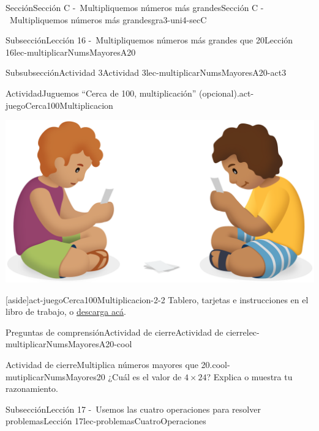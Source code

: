 \documentclass[twoside,10pt,]{article}
\begin{document}
\begin{sectionptx}{Sección}{Sección C -~Multipliquemos números más grandes}{}{Sección C -~Multipliquemos números más grandes}{}{}{gra3-uni4-secC}
\begin{subsectionptx}{Subsección}{Lección 16 -~Multipliquemos números más grandes que 20}{}{Lección 16}{}{}{lec-multiplicarNumsMayoresA20}
\begin{subsubsectionptx}{Subsubsección}{Actividad 3}{}{Actividad 3}{}{}{lec-multiplicarNumsMayoresA20-act3}
\begin{activity}{Actividad}{Juguemos “Cerca de 100, multiplicación” (opcional).}{act-juegoCerca100Multiplicacion}
\begin{sidebyside}{2}{0.05}{0.05}{0.1}
\begin{sbspanel}{0.5}
\end{sbspanel}%
\begin{sbspanel}{0.3}%
\includegraphics[width=\linewidth]{external/png-source/CS 3.4 Lesson 16 Activity 2.png}
\end{sbspanel}%
\end{sidebyside}%
\begin{aside}{[aside]}{}{act-juegoCerca100Multiplicacion-2-2}%
Tablero, tarjetas e instrucciones en el libro de trabajo, o \href{external/act-pdf/act-juegoCerca100Multiplicacion.pdf}{descarga acá}\footnotemark{}.%
\end{aside}
\end{activity}%
%
\end{subsubsectionptx}
%
%
\typeout{************************************************}
\typeout{************************************************}
%
\begin{reading-questions-subsubsection}{Preguntas de comprensión}{Actividad de cierre}{}{Actividad de cierre}{}{}{lec-multiplicarNumsMayoresA20-cool}
\begin{project}{Actividad de cierre}{Multiplica números mayores que 20.}{cool-mutiplicarNumsMayores20}%
¿Cuál es el valor de \(4\times 24\)? Explica o muestra tu razonamiento.%
\end{project}%
\end{reading-questions-subsubsection}
\end{subsectionptx}
%
%
\typeout{************************************************}
\typeout{************************************************}
%
\begin{subsectionptx}{Subsección}{Lección 17 -~Usemos las cuatro operaciones para resolver problemas}{}{Lección 17}{}{}{lec-problemasCuatroOperaciones}

\end{subsectionptx}
\end{sectionptx}
\end{document}
